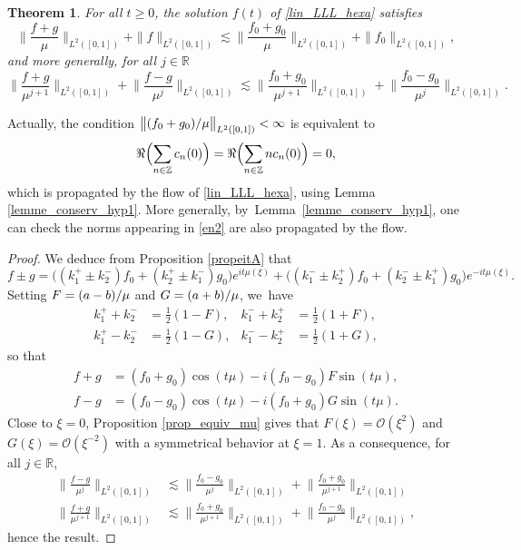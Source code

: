 \documentclass[JEP,XML,SOM,Unicode,NoFloatCountersInSection,published]{cedram}
\newtheorem{theorem}{Theorem}[section]
\theoremstyle{definition}
\let\dis\relax
\newcommand\R{\mathbb R}
\newcommand\Z{\mathbb Z}
\newcommand{\Bpa}[1]{\Bigl(#1\Bigr)}
\begin{document}
\begin{theorem}
\label{thmL2stable}
For all $t \geq 0$, the solution $f(t)$ of \eqref{lin_LLL_hexa} satisfies
\begin{equation*}
\Big\|\frac{{f}+{g}}{\mu} \Big\|_{L^2([0, 1])} + \|{f}\|_{L^2([0, 1])} \lesssim \Big\|\frac{{f}_0+{g}_0}{\mu} \Big\|_{L^2([0, 1])}+ \|{f}_0\|_{L^2([0, 1])},
\end{equation*}
and more generally, for all $j \in \R$
\begin{equation}\label{en2}
\Big\|\frac{{f}+{g}}{\mu^{j+1}} \Big\|_{L^2([0, 1])}+\Big\|\frac{{f}-{g}}{\mu^j} \Big\|_{L^2([0, 1])} \lesssim \Big\|\frac{{f}_0+{g}_0}{\mu^{j+1}} \Big\|_{L^2([0, 1])}+ \Big\|\frac{{f}_0-{g}_0}{\mu^j} \Big\|_{L^2([0, 1])}.
\end{equation}
\end{theorem}

Actually, the condition $\dis \big\|({f}_0+{g}_0)/{\mu} \big\|_{L^2([0, 1])} <\infty$ is equivalent to
\[
\Re\Bpa{\sum_{n\in\Z}c_n(0)} = \Re\Bpa{\sum_{n\in\Z}nc_n(0)}=0,
\]
which is propagated by the flow of \eqref{lin_LLL_hexa}, using Lemma \ref{lemme_conserv_hyp1}. More generally, by~Lem\-ma~\ref{lemme_conserv_hyp1}, one can check the norms appearing in \eqref{en2} are also propagated by the flow.

\begin{proof}
We deduce from Proposition \ref{propeitA} that
\[
{f}\pm{g} =\big ((k_1^{+}\pm k_{2}^{-}) {f}_0+ (k_2^{+}\pm k_{1}^{-}) {g}_0 \bigr)e^{it\mu(\xi)} + \big ((k_1^{-} \pm k_{2}^{+}) {f}_0+ (k_2^{-} \pm k_{1}^{+}) {g}_0 \bigr)e^{-it\mu(\xi)}. 
\]
Setting $\dis F=(a-b)/\mu$ and $\dis G=(a+b)/\mu$, we~have
\begin{align*}
k_1^{+}+k_{2}^{-}&=\frac12(1-F), & k_1^{-}+k_{2}^{+}&=\frac12(1+F), \\
k_1^{+}-k_{2}^{-}&=\frac12(1-G), & k_1^{-}-k_{2}^{+}&=\frac12(1+G),
\end{align*}
so that\vspace*{-3pt}
\begin{align*}
{f}+{g} &= ({f}_0+{g}_0)\cos(t \mu)-i ({f}_0-{g}_0) F \sin(t \mu), 
\\
{f}-{g} &= ({f}_0-{g}_0)\cos(t \mu)- i({f}_0+{g}_0) G \sin(t \mu).
\end{align*}
Close to $\xi=0$, Proposition \ref{prop_equiv_mu} gives that $F(\xi) =\mathcal{O}(\xi^2)$ and $G(\xi) =\mathcal{O}(\xi^{-2})$ with a symmetrical behavior at $\xi=1$. As a consequence, for all $j \in \mathbb{R}$,
\begin{align*}
\Big\|\frac{{f}-{g}}{\mu^j} \Big\|_{L^2([0, 1])} &\lesssim \Big\|\frac{{f}_0-{g}_0}{\mu^j} \Big\|_{L^2([0, 1])}+ \Big\|\frac{{f}_0+{g}_0}{\mu^{j+1}} \Big\|_{L^2([0, 1])} \\[4pt]
\Big\|\frac{{f}+{g}}{\mu^{j+1}} \Big\|_{L^2([0, 1])} &\lesssim \Big\|\frac{{f}_0+{g}_0}{\mu^{j+1}} \Big\|_{L^2([0, 1])}+ \Big\|\frac{{f}_0-{g}_0}{\mu^j} \Big\|_{L^2([0, 1])},
\end{align*}
hence the result.
\end{proof}
\end{document}
